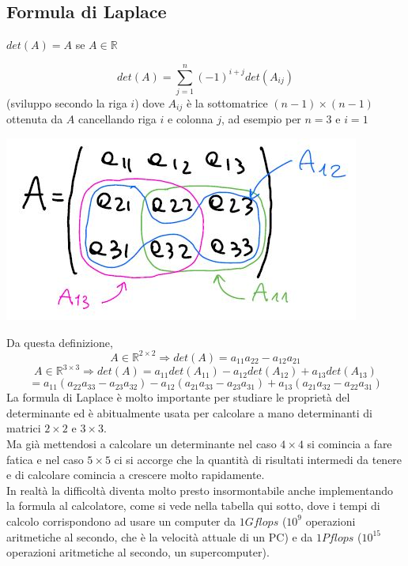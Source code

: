 \subsection{Formula di Laplace}
\begin{center}
    $det(A)=A$ se $A\in\mathbb{R}$
\end{center}
\begin{equation*}
    det(A)=\sum_{j=1}^n(-1)^{i+j}det(A_{ij})
\end{equation*}
(sviluppo secondo la riga $i$) dove $A_{ij}$ è la sottomatrice $(n-1)\times(n-1)$ ottenuta da $A$ cancellando riga $i$ e colonna $j$, ad esempio per $n=3$ e $i=1$
\begin{center}
    \includegraphics[scale=0.5]{foto/pag4}    
\end{center}
Da questa definizione,
\begin{equation*}
    A\in\mathbb{R}^{2\times 2}\Rightarrow det(A)=a_{11}a_{22}-a_{12}a_{21}
\end{equation*}
\begin{equation*}
        A\in\mathbb{R}^{3\times 3}\Rightarrow det(A)=a_{11}det(A_{11})-a_{12}det(A_{12})+a_{13}det(A_{13})
\end{equation*}
\begin{equation*}
    = a_{11}(a_{22}a_{33}-a_{23}a_{32})-a_{12}(a_{21}a_{33}-a_{23}a_{31})+a_{13}(a_{21}a_{32}-a_{22}a_{31})
\end{equation*}
La formula di Laplace è molto importante per studiare le proprietà del determinante ed è abitualmente usata per calcolare a mano determinanti di matrici $2\times 2$ e $3\times 3$.\\
Ma già mettendosi a calcolare un determinante nel caso $4\times 4$ si comincia a fare fatica e nel caso $5\times5$ ci si accorge che la quantità di risultati intermedi da tenere e di calcolare comincia a crescere molto rapidamente.\\In realtà la difficoltà diventa molto presto insormontabile anche implementando la formula al calcolatore, come si vede nella tabella qui sotto, dove i tempi di calcolo corrispondono ad usare un computer da $1Gflops$ ($10^9$ operazioni aritmetiche al secondo, che è la velocità attuale di un PC) e da $1Pflops$ ($10^{15}$ operazioni aritmetiche al secondo, un supercomputer).

